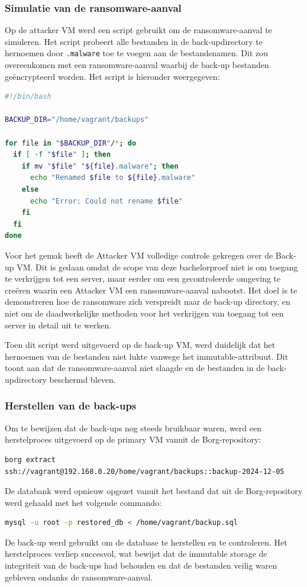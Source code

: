 \subsubsection{Simulatie van de ransomware-aanval}
Op de attacker VM werd een script gebruikt om de ransomware-aanval te simuleren. Het script probeert alle bestanden in de back-updirectory te hernoemen door \texttt{.malware} toe te voegen aan de bestandsnamen. Dit zou overeenkomen met een ransomware-aanval waarbij de back-up bestanden geëncrypteerd worden. Het script is hieronder weergegeven:
\begin{lstlisting}[language=bash, caption={Bash script om een ransomware-aanval na te bootsen}]
#!/bin/bash
    
BACKUP_DIR="/home/vagrant/backups"
    
for file in "$BACKUP_DIR"/*; do
  if [ -f "$file" ]; then
    if mv "$file" "${file}.malware"; then
      echo "Renamed $file to ${file}.malware"
    else      
      echo "Error: Could not rename $file"    
    fi    
  fi    
done    
\end{lstlisting}
Voor het gemak heeft de Attacker VM volledige controle gekregen over de Back-up VM. Dit is gedaan omdat de scope van deze bachelorproef niet is om toegang te verkrijgen tot een server, maar eerder om een gecontroleerde omgeving te creëren waarin een Attacker VM een ransomware-aanval nabootst. Het doel is te demonstreren hoe de ransomware zich verspreidt naar de back-up directory, en niet om de daadwerkelijke methoden voor het verkrijgen van toegang tot een server in detail uit te werken.

Toen dit script werd uitgevoerd op de back-up VM, werd duidelijk dat het hernoemen van de bestanden niet lukte vanwege het immutable-attribuut. Dit toont aan dat de ransomware-aanval niet slaagde en de bestanden in de back-updirectory beschermd bleven.

\subsubsection{Herstellen van de back-ups}
Om te bewijzen dat de back-ups nog steeds bruikbaar waren, werd een herstelproces uitgevoerd op de primary VM vanuit de Borg-repository:
\begin{lstlisting}[language=bash, caption={Borg commando om een back-up te herstellen}]
borg extract 
ssh://vagrant@192.168.0.20/home/vagrant/backups::backup-2024-12-05
\end{lstlisting}

De databank werd opnieuw opgezet vanuit het bestand dat uit de Borg-repository werd gehaald met het volgende commando:
\begin{lstlisting}[language=bash, caption={MySQL commando om een databank te herstellen vanuit een .sql-bestand}]
mysql -u root -p restored_db < /home/vagrant/backup.sql
\end{lstlisting}
De back-up werd gebruikt om de database te herstellen en te controleren. Het herstelproces verliep succesvol, wat bewijst dat de immutable storage de integriteit van de back-ups had behouden en dat de bestanden veilig waren gebleven ondanks de ransomware-aanval.

